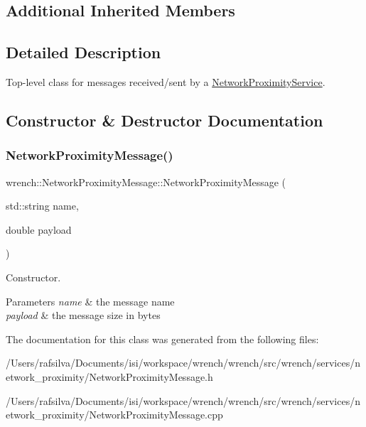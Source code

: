 \subsection*{Additional Inherited Members}


\subsection{Detailed Description}
Top-\/level class for messages received/sent by a \hyperlink{classwrench_1_1_network_proximity_service}{Network\+Proximity\+Service}. 

\subsection{Constructor \& Destructor Documentation}
\mbox{\label{classwrench_1_1_network_proximity_message_a686b73df3ed6756f016340c570716a88}} 
\subsubsection{\texorpdfstring{Network\+Proximity\+Message()}{NetworkProximityMessage()}}
{\footnotesize\ttfamily wrench\+::\+Network\+Proximity\+Message\+::\+Network\+Proximity\+Message (\begin{DoxyParamCaption}\item[{std\+::string}]{name,  }\item[{double}]{payload }\end{DoxyParamCaption})\hspace{0.3cm}{\ttfamily [protected]}}



Constructor. 


\begin{DoxyParams}{Parameters}
{\em name} & the message name \\
\hline
{\em payload} & the message size in bytes \\
\hline
\end{DoxyParams}


The documentation for this class was generated from the following files\+:\begin{DoxyCompactItemize}
\item 
/\+Users/rafsilva/\+Documents/isi/workspace/wrench/wrench/src/wrench/services/network\+\_\+proximity/Network\+Proximity\+Message.\+h\item 
/\+Users/rafsilva/\+Documents/isi/workspace/wrench/wrench/src/wrench/services/network\+\_\+proximity/Network\+Proximity\+Message.\+cpp\end{DoxyCompactItemize}
